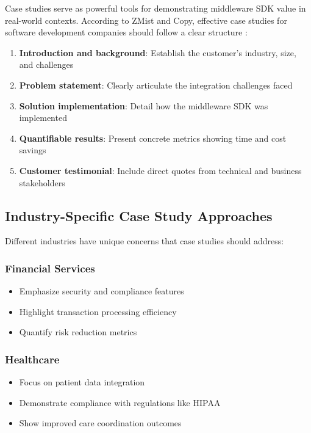 \documentclass[11pt,a4paper]{article}
\begin{document}
Case studies serve as powerful tools for demonstrating middleware SDK value in real-world contexts. According to ZMist and Copy, effective case studies for software development companies should follow a clear structure \cite{zmist2023}:

\begin{enumerate}
    \item \textbf{Introduction and background}: Establish the customer's industry, size, and challenges
    \item \textbf{Problem statement}: Clearly articulate the integration challenges faced
    \item \textbf{Solution implementation}: Detail how the middleware SDK was implemented
    \item \textbf{Quantifiable results}: Present concrete metrics showing time and cost savings
    \item \textbf{Customer testimonial}: Include direct quotes from technical and business stakeholders
\end{enumerate}

\subsection{Industry-Specific Case Study Approaches}

Different industries have unique concerns that case studies should address:

\subsubsection{Financial Services}
\begin{itemize}
    \item Emphasize security and compliance features
    \item Highlight transaction processing efficiency
    \item Quantify risk reduction metrics
\end{itemize}

\subsubsection{Healthcare}
\begin{itemize}
    \item Focus on patient data integration
    \item Demonstrate compliance with regulations like HIPAA
    \item Show improved care coordination outcomes
\end{itemize}
\end{document}
